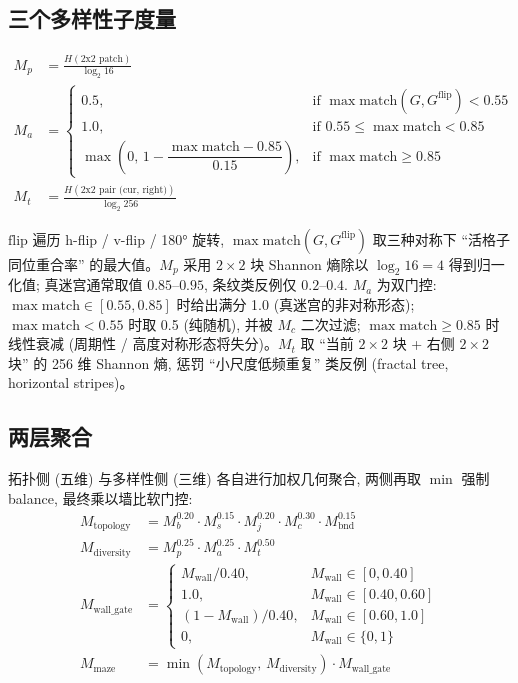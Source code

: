 \subsection{三个多样性子度量}
\begin{align}
  M_p &= \frac{H(\text{2x2 patch})}{\log_2 16} \label{eq:mp}\\
  M_a &= \begin{cases}
    0.5, & \text{if } \max \mathrm{match}(G, G^{\text{flip}}) < 0.55 \\
    1.0, & \text{if } 0.55 \le \max \mathrm{match} < 0.85 \\
    \max\!\left(0,\, 1 - \dfrac{\max \mathrm{match} - 0.85}{0.15}\right), & \text{if } \max \mathrm{match} \ge 0.85
  \end{cases} \label{eq:ma}\\
  M_t &= \frac{H(\text{2x2 pair (cur, right)})}{\log_2 256} \label{eq:mt}
\end{align}

$\mathrm{flip}$ 遍历 h-flip / v-flip / 180° 旋转, $\max \mathrm{match}(G, G^{\text{flip}})$ 取三种对称下 ``活格子同位重合率'' 的最大值。$M_p$ 采用 $2 \times 2$ 块 Shannon 熵除以 $\log_2 16 = 4$ 得到归一化值; 真迷宫通常取值 $0.85$--$0.95$, 条纹类反例仅 $0.2$--$0.4$. $M_a$ 为双门控: $\max \mathrm{match} \in [0.55, 0.85]$ 时给出满分 1.0 (真迷宫的非对称形态); $\max \mathrm{match} < 0.55$ 时取 0.5 (纯随机), 并被 $M_c$ 二次过滤; $\max \mathrm{match} \ge 0.85$ 时线性衰减 (周期性 / 高度对称形态将失分)。$M_t$ 取 ``当前 $2 \times 2$ 块 + 右侧 $2 \times 2$ 块'' 的 256 维 Shannon 熵, 惩罚 ``小尺度低频重复'' 类反例 (fractal tree, horizontal stripes)。

\subsection{两层聚合}

拓扑侧 (五维) 与多样性侧 (三维) 各自进行加权几何聚合, 两侧再取 $\min$ 强制 balance, 最终乘以墙比软门控:
\begin{align}
  M_{\text{topology}} &= M_b^{0.20} \cdot M_s^{0.15} \cdot M_j^{0.20} \cdot M_c^{0.30} \cdot M_{\text{bnd}}^{0.15} \label{eq:topo}\\
  M_{\text{diversity}} &= M_p^{0.25} \cdot M_a^{0.25} \cdot M_t^{0.50} \label{eq:div}\\
  M_{\text{wall\_gate}} &= \begin{cases}
    M_{\text{wall}} / 0.40, & M_{\text{wall}} \in [0, 0.40] \\
    1.0, & M_{\text{wall}} \in [0.40, 0.60] \\
    (1 - M_{\text{wall}}) / 0.40, & M_{\text{wall}} \in [0.60, 1.0] \\
    0, & M_{\text{wall}} \in \{0, 1\}
  \end{cases} \label{eq:gate}\\
  M_{\text{maze}} &= \min\!\left(M_{\text{topology}},\, M_{\text{diversity}}\right) \cdot M_{\text{wall\_gate}} \label{eq:final}
\end{align}

